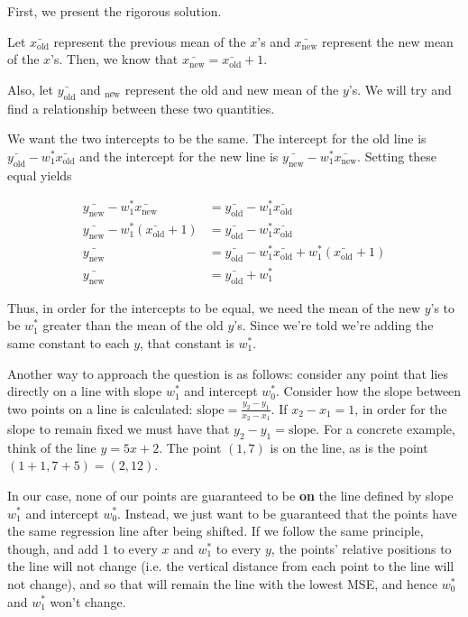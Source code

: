 \documentclass{article}
\begin{document}
\begin{probset}
\begin{prob}
\begin{subprobset}
\begin{subprob}[4 Points]
\begin{soln}

First, we present the rigorous solution.

Let $\bar{x_\text{old}}$ represent the previous mean of the $x$'s and $\bar{x_\text{new}}$ represent the new mean of the $x$'s. Then, we know that $\bar{x_\text{new}} = \bar{x_\text{old}} + 1$.

Also, let $\bar{y_\text{old}}$ and $\bar{_\text{new}}$ represent the old and new mean of the $y$'s. We will try and find a relationship between these two quantities.

We want the two intercepts to be the same. The intercept for the old line is $\bar{y_\text{old}} - w_1^* \bar{x_\text{old}}$ and the intercept for the new line is $\bar{y_\text{new}} - w_1^* \bar{x_\text{new}}$. Setting these equal yields

\begin{align*}
    \bar{y_\text{new}} - w_1^* \bar{x_\text{new}} &= \bar{y_\text{old}} - w_1^* \bar{x_\text{old}} \\
     \bar{y_\text{new}} - w_1^* (\bar{x_\text{old}} + 1) &= \bar{y_\text{old}} - w_1^* \bar{x_\text{old}} \\
     \bar{y_\text{new}} &= \bar{y_\text{old}} - w_1^* \bar{x_\text{old}} + w_1^* (\bar{x_\text{old}} + 1) \\
     \bar{y_{\text{new}}} &= \bar{y_\text{old}} + w_1^*
\end{align*}

Thus, in order for the intercepts to be equal, we need the mean of the new $y$'s to be $w_1^*$ greater than the mean of the old $y$'s. Since we're told we're adding the same constant to each $y$, that constant is $w_1^*$.

\vspace{.2in}

Another way to approach the question is as follows: consider any point that lies directly on a line with slope $w_1^*$ and intercept $w_0^*$. Consider how the slope between two points on a line is calculated: $\text{slope} = \frac{y_2 - y_1}{x_2 - x_1}$. If $x_2 - x_1 = 1$, in order for the slope to remain fixed we must have that $y_2 - y_1 = \text{slope}$. For a concrete example, think of the line $y = 5x + 2$. The point $(1, 7)$ is on the line, as is the point $(1 + 1, 7 + 5) = (2, 12)$.

In our case, none of our points are guaranteed to be \textbf{on} the line defined by slope $w_1^*$ and intercept $w_0^*$. Instead, we just want to be guaranteed that the points have the same regression line after being shifted. If we follow the same principle, though, and add 1 to every $x$ and $w_1^*$ to every $y$, the points' relative positions to the line will not change (i.e. the vertical distance from each point to the line will not change), and so that will remain the line with the lowest MSE, and hence $w_0^*$ and $w_1^*$ won't change.


\end{soln}
\end{subprob}
\end{subprobset}
\end{prob}
\end{probset}
\end{document}
